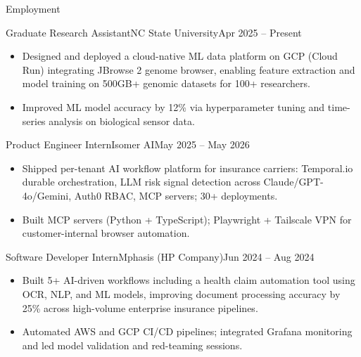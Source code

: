 \documentclass[]{mcdowellcv}
\begin{document}
\makeheader

\begin{cvsection}{Employment}
  \begin{cvsubsection}{Graduate Research Assistant}{NC State University}{Apr 2025 -- Present}
    \begin{itemize}
      \item Designed and deployed a cloud-native ML data platform on GCP (Cloud Run) integrating JBrowse 2 genome browser, enabling feature extraction and model training on 500GB+ genomic datasets for 100+ researchers.
      \item Improved ML model accuracy by 12\% via hyperparameter tuning and time-series analysis on biological sensor data.
    \end{itemize}
    \vspace{-1.5pt}
  \end{cvsubsection}

  \begin{cvsubsection}{Product Engineer Intern}{Isomer AI}{May 2025 -- May 2026}
    \begin{itemize}
      \item Shipped per-tenant AI workflow platform for insurance carriers: Temporal.io durable orchestration, LLM risk signal detection across Claude/GPT-4o/Gemini, Auth0 RBAC, MCP servers; 30+ deployments.
      \item Built MCP servers (Python + TypeScript); Playwright + Tailscale VPN for customer-internal browser automation.
    \end{itemize}
    \vspace{-1.5pt}
  \end{cvsubsection}

  \begin{cvsubsection}{Software Developer Intern}{Mphasis (HP Company)}{Jun 2024 -- Aug 2024}
    \begin{itemize}
      \item Built 5+ AI-driven workflows including a health claim automation tool using OCR, NLP, and ML models, improving document processing accuracy by 25\% across high-volume enterprise insurance pipelines.
      \item Automated AWS and GCP CI/CD pipelines; integrated Grafana monitoring and led model validation and red-teaming sessions.
    \end{itemize}
    \vspace{-1.5pt}
  \end{cvsubsection}


\end{cvsection}
\end{document}

